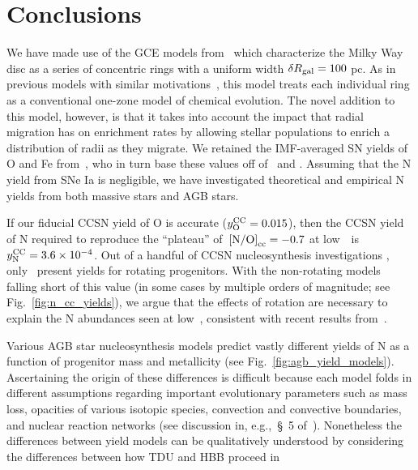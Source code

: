 \documentclass[ms.tex]{subfiles}
\begin{document}
\section{Conclusions}
\label{sec:conclusions}

We have made use of the GCE models from~\citet{Johnson2021} which characterize
the Milky Way disc as a series of concentric rings with a uniform width
$\delta R_\text{gal} = 100$ pc.
As in previous models with similar motivations~\citep{Matteucci1989,
Wyse1989, Prantzos1995, Schoenrich2009, Minchev2013, Minchev2014, Minchev2017,
Sharma2021}, this model treats each individual ring as a conventional one-zone
model of chemical evolution.
The novel addition to this model, however, is that it takes into account the
impact that radial migration has on enrichment rates by allowing stellar
populations to enrich a distribution of radii as they migrate.
We retained the IMF-averaged SN yields of O and Fe from~\citet{Johnson2021},
who in turn base these values off of~\citet{Weinberg2017} and
\citet{Johnson2020}.
Assuming that the N yield from SNe Ia is negligible, we have investigated
theoretical and empirical N yields from both massive stars and AGB stars.
\par
If our fiducial CCSN yield of O is accurate ($y_\text{O}^\text{CC} = 0.015$), then the CCSN
yield of N required to reproduce the ``plateau'' of~$\text{[N/O]}_\text{cc} = -0.7$ at
low~\oh~is~$y_\text{N}^\text{CC} = 3.6\times10^{-4}$.
Out of a handful of CCSN nucleosynthesis investigations
\citep[e.g.][]{Woosley1995, Nomoto2013, Sukhbold2016}, only~\citet{Limongi2018}
present yields for rotating progenitors.
With the non-rotating models falling short of this value (in some cases by
multiple orders of magnitude; see Fig.~\ref{fig:n_cc_yields}), we argue that
the effects of rotation are necessary to explain the N abundances seen at
low~\oh, consistent with recent results from~\citet{Grisoni2021}.
\par
Various AGB star nucleosynthesis models predict vastly different yields of N
as a function of progenitor mass and metallicity (see
Fig.~\ref{fig:agb_yield_models}).
Ascertaining the origin of these differences is difficult because each model
folds in different assumptions regarding important evolutionary parameters such
as mass loss, opacities of various isotopic species, convection and convective
boundaries, and nuclear reaction networks (see discussion in, e.g.,~\S~5
of~\citealp{Karakas2016}).
Nonetheless the differences between yield models can be qualitatively
understood by considering the differences between how TDU and HBB proceed in
\end{document}

